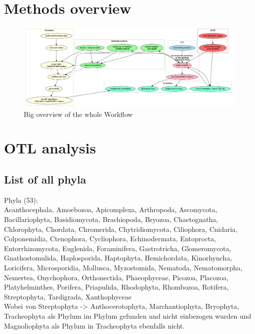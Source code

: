  \section{Methods overview}
    \begin{figure}[h!]
      \centering
      \includegraphics[width=\textwidth]{Figures/Workflow.png}
      \caption{Big overview of the whole Workflow}
      \label{fig:BigWorkflow}
    \end{figure}

  \section{OTL analysis}\label{sec:appendix - otl analysis}

    \subsection{List of all phyla}\label{subsec:listPhyla}

    Phyla (53): \\
    Acanthocephala, Amoebozoa, Apicomplexa, Arthropoda, Ascomycota, Bacillariophyta, Basidiomycota, 
      Brachiopoda, Bryozoa, Chaetognatha, Chlorophyta, Chordata, Chromerida, Chytridiomycota, 
      Ciliophora, Cnidaria, Colponemidia, Ctenophora, Cycliophora, Echinodermata, Entoprocta, 
      Entorrhizomycota, Euglenida, Foraminifera, Gastrotricha, Glomeromycota, Gnathostomulida, 
      Haplosporida, Haptophyta, Hemichordata, Kinorhyncha, Loricifera, Microsporidia, Mollusca, 
      Myzostomida, Nematoda, Nematomorpha, Nemertea, Onychophora, Orthonectida, Phaeophyceae, 
      Picozoa, Placozoa, Platyhelminthes, Porifera, Priapulida, Rhodophyta, Rhombozoa, Rotifera, 
      Streptophyta, Tardigrada, Xanthophyceae \\
    Wobei von Streptophyta -> Anthocerotophyta, Marchantiophyta, Bryophyta, Tracheophyta als
      Phylum im Phylum gefunden und nicht einbezogen wurden und Magnoliophyta als Phylum in 
      Tracheophyta ebenfalls nicht. \\

